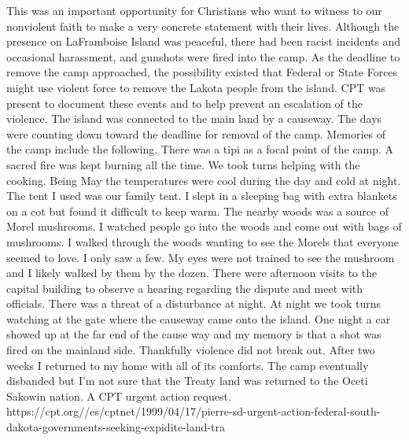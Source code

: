 This was an important opportunity for Christians who want to witness to our nonviolent faith to make a very concrete statement with their lives. Although the presence on LaFramboise Island was peaceful, there had been racist incidents and occasional harassment, and gunshots were fired into the camp. As the deadline to remove the camp approached, the possibility existed that Federal or State Forces might use violent force to remove the Lakota people from the island. CPT was present to document these events and to help prevent an escalation of the violence.
The island was connected to the main land by a causeway. The days were counting down toward the deadline for removal of the camp. Memories of the camp include the following. There was a tipi as a focal point of the camp. A sacred fire was kept burning all the time. We took turns helping with the cooking. Being May the temperatures were cool during the day and cold at night. The tent I used was our family tent. I slept in a sleeping bag with extra blankets on a cot but found it difficult to keep warm. The nearby woods was a source of Morel mushrooms. I watched people go into the woods and come out with bags of mushrooms. I walked through the woods wanting to see the Morels that everyone seemed to love. I only saw a few. My eyes were not trained to see the mushroom and I likely walked by them by the dozen. 
There were afternoon visits to the capital building to observe a hearing regarding the dispute and meet with officials. There was a threat of a disturbance at night. At night we took turns watching at the gate where the causeway came onto the island. One night a car showed up at the far end of the cause way and my memory is that a shot was fired on the mainland side. Thankfully violence did not break out. 
After two weeks I returned to my home with all of its comforts. The camp eventually disbanded but I'm not sure that the Treaty land was returned to the Oceti Sakowin nation. 
A CPT urgent action request.
https://cpt.org//es/cptnet/1999/04/17/pierre-sd-urgent-action-federal-south-dakota-governments-seeking-expidite-land-tra





